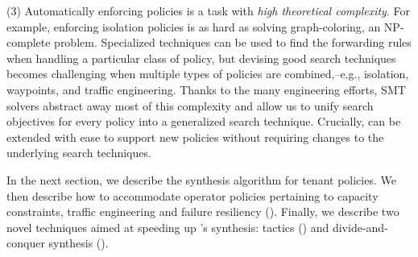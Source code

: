 (3) Automatically enforcing policies is a task with
\emph{high theoretical complexity}.  For example, enforcing isolation
policies is as hard as solving graph-coloring, an 
NP-complete problem.  Specialized techniques can be used to find the
forwarding rules when handling a particular class of policy, but 
 devising good search techniques becomes
 challenging when 
multiple types of policies are combined,--e.g., isolation, waypoints,
and traffic engineering.  Thanks to the many engineering efforts, SMT solvers
abstract away most of this complexity and allow us to unify search
objectives for every policy into a generalized search technique.
Crucially, \Name can be extended with ease to support new policies  without requiring changes to the underlying search
techniques.

In the next section, we describe the \Name synthesis
algorithm for tenant policies. 
We then describe how to accommodate operator policies pertaining to
capacity constraints, traffic engineering and failure resiliency
().  Finally, we describe two novel techniques aimed at
speeding up \Name's synthesis: tactics () and
divide-and-conquer synthesis ().



